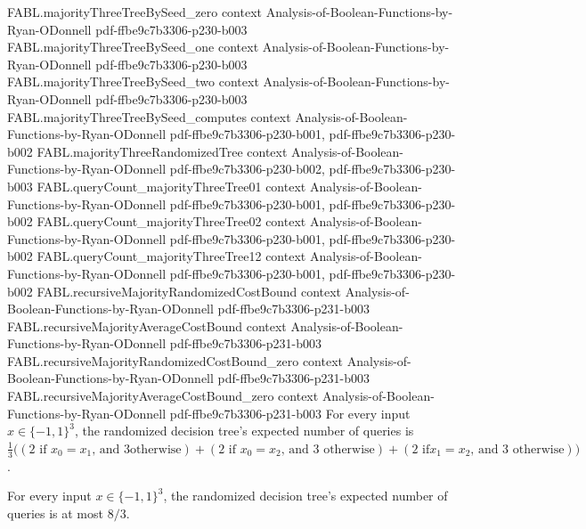 \begin{theorem}
  {FABL.majorityThreeTreeBySeed_zero}
  {context}
  {Analysis-of-Boolean-Functions-by-Ryan-ODonnell}
  {pdf-ffbe9c7b3306-p230-b003}
\proofstep
  {FABL.majorityThreeTreeBySeed_one}
  {context}
  {Analysis-of-Boolean-Functions-by-Ryan-ODonnell}
  {pdf-ffbe9c7b3306-p230-b003}
\proofstep
  {FABL.majorityThreeTreeBySeed_two}
  {context}
  {Analysis-of-Boolean-Functions-by-Ryan-ODonnell}
  {pdf-ffbe9c7b3306-p230-b003}
\proofstep
  {FABL.majorityThreeTreeBySeed_computes}
  {context}
  {Analysis-of-Boolean-Functions-by-Ryan-ODonnell}
  {pdf-ffbe9c7b3306-p230-b001,
    pdf-ffbe9c7b3306-p230-b002}
\proofstep
  {FABL.majorityThreeRandomizedTree}
  {context}
  {Analysis-of-Boolean-Functions-by-Ryan-ODonnell}
  {pdf-ffbe9c7b3306-p230-b002,
    pdf-ffbe9c7b3306-p230-b003}
\proofstep
  {FABL.queryCount_majorityThreeTree01}
  {context}
  {Analysis-of-Boolean-Functions-by-Ryan-ODonnell}
  {pdf-ffbe9c7b3306-p230-b001,
    pdf-ffbe9c7b3306-p230-b002}
\proofstep
  {FABL.queryCount_majorityThreeTree02}
  {context}
  {Analysis-of-Boolean-Functions-by-Ryan-ODonnell}
  {pdf-ffbe9c7b3306-p230-b001,
    pdf-ffbe9c7b3306-p230-b002}
\proofstep
  {FABL.queryCount_majorityThreeTree12}
  {context}
  {Analysis-of-Boolean-Functions-by-Ryan-ODonnell}
  {pdf-ffbe9c7b3306-p230-b001,
    pdf-ffbe9c7b3306-p230-b002}
\proofstep
  {FABL.recursiveMajorityRandomizedCostBound}
  {context}
  {Analysis-of-Boolean-Functions-by-Ryan-ODonnell}
  {pdf-ffbe9c7b3306-p231-b003}
\proofstep
  {FABL.recursiveMajorityAverageCostBound}
  {context}
  {Analysis-of-Boolean-Functions-by-Ryan-ODonnell}
  {pdf-ffbe9c7b3306-p231-b003}
\proofstep
  {FABL.recursiveMajorityRandomizedCostBound_zero}
  {context}
  {Analysis-of-Boolean-Functions-by-Ryan-ODonnell}
  {pdf-ffbe9c7b3306-p231-b003}
\proofstep
  {FABL.recursiveMajorityAverageCostBound_zero}
  {context}
  {Analysis-of-Boolean-Functions-by-Ryan-ODonnell}
  {pdf-ffbe9c7b3306-p231-b003}
For every input $x\in\{−1,1\}^3$, the randomized decision tree's expected number of
queries is $\frac{1}{3}\bigl((2\text{ if }x_0=x_1\text{, and }3\text{
otherwise})+(2\text{ if }x_0=x_2\text{, and }3\text{ otherwise})+(2\text{ if
}x_1=x_2\text{, and }3\text{ otherwise})\bigr)$.
\end{theorem}

\begin{theorem}
\label{FABL.majorityThreeRandomizedTree_inputCost_le}
\leanok
{}
For every input $x\in\{−1,1\}^3$, the randomized decision tree's expected number of
queries is at most $8/3$.
\end{theorem}

